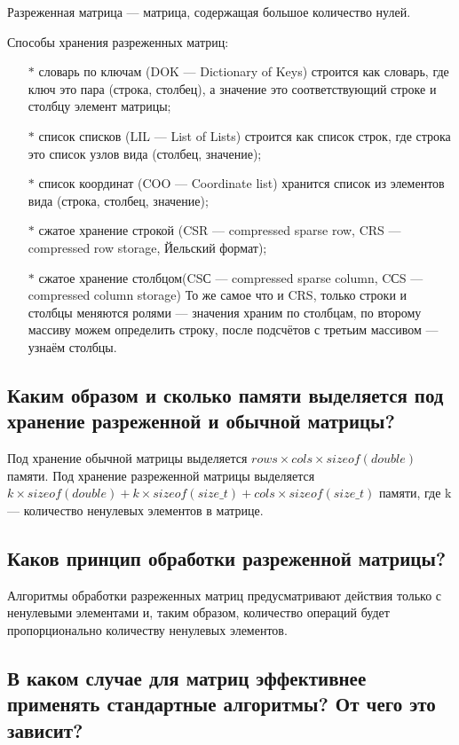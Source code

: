 \documentclass[a4paper,12pt]{extarticle}
\begin{document}
Разреженная матрица --- матрица, содержащая большое количество нулей.

Способы хранения разреженных матриц:

\begin{itemize}
	\item[$*$] словарь по ключам (DOK --- Dictionary of Keys) строится как словарь, где ключ это пара (строка, столбец), а значение это соответствующий строке и столбцу элемент матрицы;
	\item[$*$] список списков (LIL --- List of Lists) строится как список строк, где строка это список узлов вида (столбец, значение);
	\item[$*$] список координат (COO --- Coordinate list) хранится список из элементов вида (строка, столбец, значение);
	\item[$*$] сжатое хранение строкой (CSR --- compressed sparse row, CRS --- compressed row storage, Йельский формат);
	\item[$*$] сжатое хранение столбцом(CSС --- compressed sparse column, CСS --- compressed column storage)
		То же самое что и CRS, только строки и столбцы меняются ролями --- значения храним по столбцам, по второму массиву можем определить строку, после подсчётов с третьим массивом --- узнаём столбцы.
\end{itemize}

\subsection{Каким образом и сколько памяти выделяется под хранение разреженной и обычной матрицы?}

Под хранение обычной матрицы выделяется $rows \times cols \times sizeof(double)$ памяти. Под хранение разреженной матрицы выделяется $k \times sizeof(double) + k \times sizeof(size\_t) + cols \times sizeof(size\_t)$ памяти, где k --- количество ненулевых элементов в матрице.


\subsection{Каков принцип обработки разреженной матрицы?}

Алгоритмы обработки разреженных матриц предусматривают действия только с ненулевыми элементами и, таким образом, количество операций будет пропорционально количеству ненулевых элементов.

\subsection{В каком случае для матриц эффективнее применять стандартные алгоритмы? От чего это зависит?}
\end{document}
